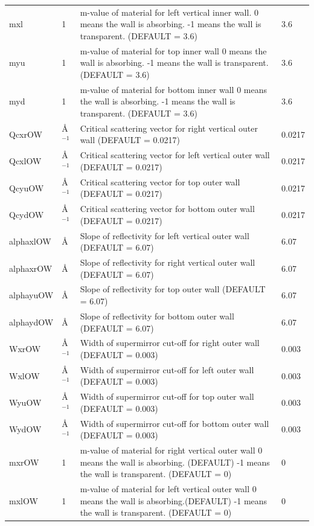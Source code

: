 \begin{longtable}{p{}p{}p{}p{}}
mxl & 1 & m-value of material for left vertical inner wall. 0 means the wall is absorbing. -1 means the wall is transparent. (DEFAULT = 3.6) & 3.6 \\
myu & 1 & m-value of material for top inner wall 0 means the wall is absorbing. -1 means the wall is transparent. (DEFAULT = 3.6) & 3.6 \\
myd & 1 & m-value of material for bottom inner wall 0 means the wall is absorbing. -1 means the wall is transparent. (DEFAULT = 3.6) & 3.6 \\
QcxrOW & \AA{}$^{-1}$ & Critical scattering vector for right vertical outer wall (DEFAULT = 0.0217) & 0.0217 \\
QcxlOW & \AA{}$^{-1}$ & Critical scattering vector for left vertical outer wall (DEFAULT = 0.0217) & 0.0217 \\
QcyuOW & \AA{}$^{-1}$ & Critical scattering vector for top outer wall (DEFAULT = 0.0217) & 0.0217 \\
QcydOW & \AA{}$^{-1}$ & Critical scattering vector for bottom outer wall (DEFAULT = 0.0217) & 0.0217 \\
alphaxlOW & \AA{} & Slope of reflectivity for left vertical outer wall (DEFAULT = 6.07) & 6.07 \\
alphaxrOW & \AA{} & Slope of reflectivity for right vertical outer wall (DEFAULT = 6.07) & 6.07 \\
alphayuOW & \AA{} & Slope of reflectivity for top outer wall (DEFAULT = 6.07) & 6.07 \\
alphaydOW & \AA{} & Slope of reflectivity for bottom outer wall (DEFAULT = 6.07) & 6.07 \\
WxrOW & \AA{}$^{-1}$ & Width of supermirror cut-off for right outer wall (DEFAULT = 0.003) & 0.003 \\
WxlOW & \AA{}$^{-1}$ & Width of supermirror cut-off for left outer wall (DEFAULT = 0.003) & 0.003 \\
WyuOW & \AA{}$^{-1}$ & Width of supermirror cut-off for top outer wall (DEFAULT = 0.003) & 0.003 \\
WydOW & \AA{}$^{-1}$ & Width of supermirror cut-off for bottom outer wall (DEFAULT = 0.003) & 0.003 \\
mxrOW & 1 & m-value of material for right vertical outer wall 0 means the wall is absorbing. (DEFAULT) -1 means the wall is transparent. (DEFAULT = 0) & 0 \\
mxlOW & 1 & m-value of material for left vertical outer wall 0 means the wall is absorbing.(DEFAULT) -1 means the wall is transparent. (DEFAULT = 0) & 0 \\

\end{longtable}
